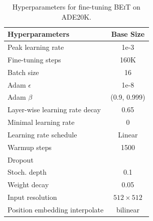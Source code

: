 \documentclass{article}
\newcommand{\xmark}{{\ding{55}}}%
\newcommand\our{\textsc{BEiT}}
\begin{document}
\begin{table}[H]
\centering
\begin{tabular}{l|c}
\toprule
\bf Hyperparameters & \bf Base Size \\
\midrule
Peak learning rate & 1e-3 \\
Fine-tuning steps & 160K \\
Batch size & 16 \\
Adam $\epsilon$ & 1e-8  \\
Adam $\beta$ & (0.9, 0.999) \\
Layer-wise learning rate decay & 0.65 \\
Minimal learning rate & 0 \\
Learning rate schedule & Linear \\
Warmup steps & 1500 \\
\midrule
Dropout & \xmark \\
Stoch. depth & 0.1 \\
Weight decay & 0.05 \\
\midrule
Input resolution & $512 \times 512$ \\
Position embedding interpolate & bilinear \\
\bottomrule
\end{tabular}
\caption{
Hyperparameters for fine-tuning \our{} on ADE20K.
}
\label{tbl:ft:ade20k:hyperparams}
\end{table}
\end{document}
